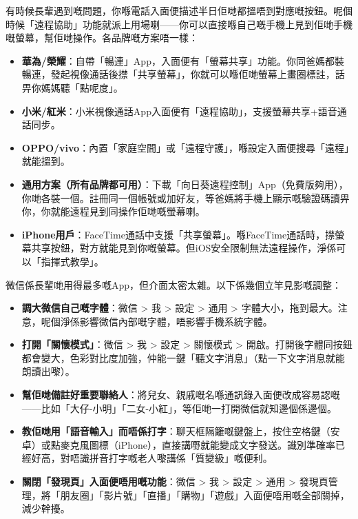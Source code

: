 
有時候長輩遇到嘅問題，你喺電話入面便描述半日佢哋都搵唔到對應嘅按鈕。呢個時候「遠程協助」功能就派上用場喇——你可以直接喺自己嘅手機上見到佢哋手機嘅螢幕，幫佢哋操作。各品牌嘅方案唔一樣：

\begin{itemize}
  \item \textbf{華為/榮耀}：自帶「暢連」App，入面便有「螢幕共享」功能。你同爸媽都裝暢連，發起視像通話後㩒「共享螢幕」，你就可以喺佢哋螢幕上畫圈標註，話畀你媽媽聽「點呢度」。
  \item \textbf{小米/紅米}：小米視像通話App入面便有「遠程協助」，支援螢幕共享+語音通話同步。
  \item \textbf{OPPO/vivo}：內置「家庭空間」或「遠程守護」，喺設定入面便搜尋「遠程」就能搵到。
  \item \textbf{通用方案（所有品牌都可用）}：下載「向日葵遠程控制」App（免費版夠用），你哋各裝一個。註冊同一個帳號或加好友，等爸媽將手機上顯示嘅驗證碼讀畀你，你就能遠程見到同操作佢哋嘅螢幕喇。
  \item \textbf{iPhone用戶}：FaceTime通話中支援「共享螢幕」。喺FaceTime通話時，㩒螢幕共享按鈕，對方就能見到你嘅螢幕。但iOS安全限制無法遠程操作，淨係可以「指揮式教學」。
\end{itemize}


微信係長輩哋用得最多嘅App，但介面太密太雜。以下係幾個立竿見影嘅調整：

\begin{itemize}
  \item \textbf{調大微信自己嘅字體}：微信 > 我 > 設定 > 通用 > 字體大小，拖到最大。注意，呢個淨係影響微信內部嘅字體，唔影響手機系統字體。
  \item \textbf{打開「關懷模式」}：微信 > 我 > 設定 > 關懷模式 > 開啟。打開後字體同按鈕都會變大，色彩對比度加強，仲能一鍵「聽文字消息」（點一下文字消息就能朗讀出嚟）。
  \item \textbf{幫佢哋備註好重要聯絡人}：將兒女、親戚嘅名喺通訊錄入面便改成容易認嘅——比如「大仔-小明」「二女-小紅」，等佢哋一打開微信就知邊個係邊個。
  \item \textbf{教佢哋用「語音輸入」而唔係打字}：聊天框隔籬嘅鍵盤上，按住空格鍵（安卓）或點麥克風圖標（iPhone），直接講嘢就能變成文字發送。識別準確率已經好高，對唔識拼音打字嘅老人嚟講係「質變級」嘅便利。
  \item \textbf{關閉「發現頁」入面便唔用嘅功能}：微信 > 我 > 設定 > 通用 > 發現頁管理，將「朋友圈」「影片號」「直播」「購物」「遊戲」入面便唔用嘅全部關掉，減少幹擾。
\end{itemize}

